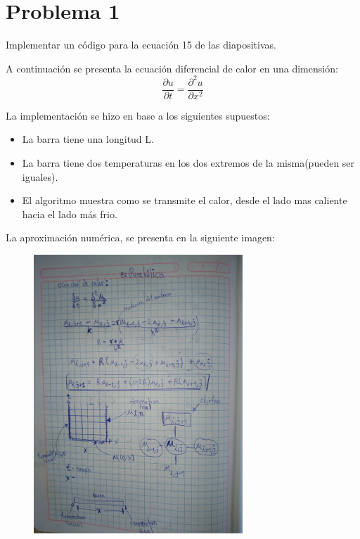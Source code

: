 \documentclass[a4paper,12pt]{article}
\begin{document}
    \section{Problema 1}
    Implementar un código para la ecuación 15 de las diapositivas.
    
    A continuación se presenta la ecuación diferencial de calor en una dimensión:
    \begin{equation}
        \frac{\partial u}{\partial t} = \frac{\partial^2 u}{\partial x^2}	
    \end{equation}

    La implementación se hizo en base a los siguientes supuestos:
    \begin{itemize}
        \item La barra tiene una longitud L.
        \item La barra tiene dos temperaturas en los dos extremos de la misma(pueden ser iguales).
        \item El algoritmo muestra como se transmite el calor, desde el lado mas caliente hacia el lado más frio.
    \end{itemize}    

    La aproximación numérica, se presenta en la siguiente imagen:
    \begin{figure}[h]
        \centering
        \includegraphics[width=0.7\textwidth]{analisis.jpg}
    \end{figure}
\end{document}
